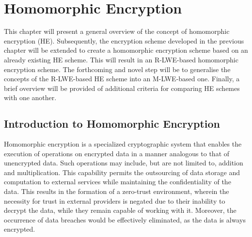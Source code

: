 \chapter{Homomorphic Encryption}

This chapter will present a general overview of the concept of homomorphic encryption (HE). Subsequently, the encryption scheme developed in the previous chapter will be extended to create a homomorphic encryption scheme based on an already existing HE scheme. This will result in an R-LWE-based homomorphic encryption scheme. The forthcoming and novel step will be to generalise the concepts of the R-LWE-based HE scheme into an M-LWE-based one. Finally, a brief overview will be provided of additional criteria for comparing HE schemes with one another.

\section{Introduction to Homomorphic Encryption}

Homomorphic encryption is a specialized cryptographic system that enables the execution of operations on encrypted data in a manner analogous to that of unencrypted data. Such operations may include, but are not limited to, addition and multiplication. This capability permits the outsourcing of data storage and computation to external services while maintaining the confidentiality of the data. This results in the formation of a zero-trust environment, wherein the necessity for trust in external providers is negated due to their inability to decrypt the data, while they remain capable of working with it. Moreover, the occurrence of data breaches would be effectively eliminated, as the data is always encrypted.

